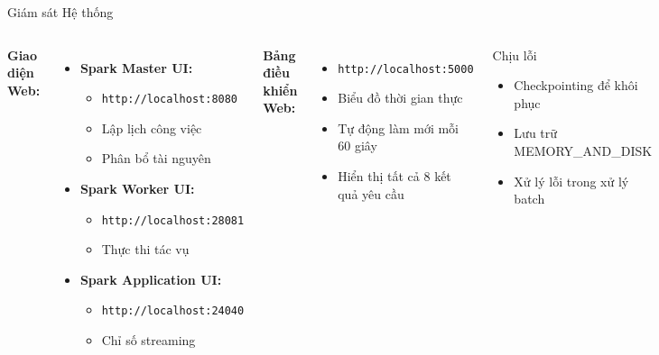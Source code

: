 \documentclass[aspectratio=169]{beamer}
\begin{document}
\begin{frame}{Giám sát Hệ thống}
    \begin{columns}
        \textbf{Giao diện Web:}
        \begin{itemize}
            \item \textbf{Spark Master UI:} 
            \begin{itemize}
                \item \texttt{http://localhost:8080}
                \item Lập lịch công việc
                \item Phân bổ tài nguyên
            \end{itemize}
            \item \textbf{Spark Worker UI:}
            \begin{itemize}
                \item \texttt{http://localhost:28081}
                \item Thực thi tác vụ
            \end{itemize}
            \item \textbf{Spark Application UI:}
            \begin{itemize}
                \item \texttt{http://localhost:24040}
                \item Chỉ số streaming
            \end{itemize}
        \end{itemize}
        
        \textbf{Bảng điều khiển Web:}
        \begin{itemize}
            \item \texttt{http://localhost:5000}
            \item Biểu đồ thời gian thực
            \item Tự động làm mới mỗi 60 giây
            \item Hiển thị tất cả 8 kết quả yêu cầu
        \end{itemize}
        
        \vspace{0.3cm}
        \begin{alertblock}{Chịu lỗi}
            \begin{itemize}
                \item Checkpointing để khôi phục
                \item Lưu trữ MEMORY\_AND\_DISK
                \item Xử lý lỗi trong xử lý batch
            \end{itemize}
        \end{alertblock}
    \end{columns}
\end{frame}
\end{document}
